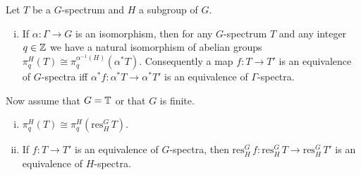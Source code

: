 \begin{lem}\label{lem:homotopygroupsrestriction}
Let $T$ be a $G$-spectrum and $H$ a subgroup of $G$.
\begin{enumerate}[(i)]
\item If $\alpha:\Gamma\to G$ is an isomorphism, then for any $G$-spectrum $T$
and any integer $q\in \mathbb{Z}$
we have a natural isomorphism of abelian groups $\pi_q^H(T)\cong \pi_q^{\alpha^{-1}(H)}(\alpha^\ast T)$.
Consequently a map $f:T\to T'$ is an equivalence of $G$-spectra iff
$\alpha^\ast f:\alpha^\ast T\to \alpha^\ast T'$ is an equivalence of $\Gamma$-spectra.
\setcounter{counter}{\value{enumi}}
\end{enumerate}
Now assume that $G = \mathbb{T}$ or that $G$ is finite.
\begin{enumerate}[(i)]
\setcounter{enumi}{\value{counter}}
\item $\pi_q^H(T)\cong \pi_q^H(\mathrm{res}^G_H\, T)$.
\item If $f:T\to T'$ is an equivalence of $G$-spectra, then $\mathrm{res}^G_H\, f:
\mathrm{res}^G_H\,T\to \mathrm{res}^G_H\, T'$ is an equivalence of
$H$-spectra.
\end{enumerate}
\end{lem}
